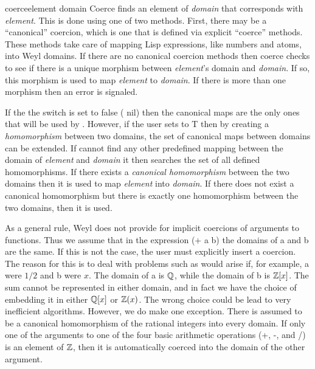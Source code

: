 \begin{genericdef}{coerce}{element domain}
Coerce finds an element of {\em domain} that corresponds with {\em
element}.  This is done using one of two methods.  First, there may be
a ``canonical'' coercion, which is one that is defined via explicit
``{\sf coerce}'' methods.  These methods take care of mapping Lisp
expressions, like numbers and atoms, into Weyl domains.  If there are
no canonical coercion methods then coerce checks to see if there is a
unique morphism between {\em element}'s domain and {\em domain}. If
so, this morphism is used to map {\em element} to {\em domain}. If
there is more than one morphism then an error is signaled.

If the the switch  is set to false ({\sf
nil}) then the canonical maps are the only ones that will be used by
.  However, if the user sets
 to {\sf T} then by creating a {\em
homomorphism} between two domains, the set of canonical maps between
domains can be extended.  If  cannot find any other
predefined mapping between the domain of {\em element} and {\em
domain\/} it then searches the set of all defined homomorphisms.  If
there exists a {\em canonical homomorphism} between the two domains
then it is used to map {\em element} into {\em domain\/}. If there
does not exist a canonical homomorphism but there is exactly one
homomorphism between the two domains, then it is used.  
\end{genericdef}


As a general rule, Weyl does not provide for implicit coercions of
arguments to functions. Thus we assume that in the expression {\sf (+
a b)} the domains of {\sf a} and {\sf b} are the same. If this is
not the case, the user must explicitly insert a coercion.  The reason
for this is to deal with problems such as would arise if, for example,
{\sf a} were $1/2$ and {\sf b} were $x$. The domain of {\sf a} is
${\Bbb Q}$, while the domain of {\sf b} is ${\Bbb Z}[x]$. The sum cannot be
represented in either domain, and in fact we have the choice of
embedding it in either ${\Bbb Q}[x]$ or ${\Bbb Z}(x)$. The wrong choice could be
lead to very inefficient algorithms. However, we do make one
exception. There is assumed to be a canonical homomorphism of the
rational integers into every domain.  If only one of the arguments to
one of the four basic arithmetic operations ({\sf +}, {\sf -}, {\sf *}
and {\sf /}) is an element of ${\Bbb Z}$, then it is automatically coerced
into the domain of the other argument.



